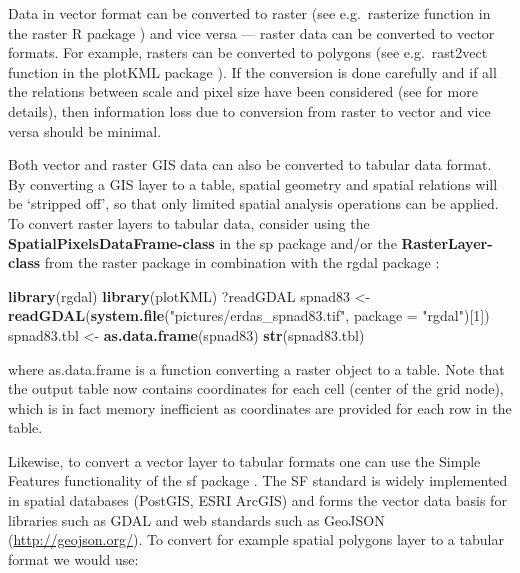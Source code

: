 \documentclass[10pt,b5paper,]{book}
\newenvironment{Shaded}{\begin{snugshade}}{\end{snugshade}}
\newcommand{\DataTypeTok}[1]{\textcolor[rgb]{0.13,0.29,0.53}{#1}}
\newcommand{\DecValTok}[1]{\textcolor[rgb]{0.00,0.00,0.81}{#1}}
\newcommand{\KeywordTok}[1]{\textcolor[rgb]{0.13,0.29,0.53}{\textbf{#1}}}
\newcommand{\NormalTok}[1]{#1}
\newcommand{\StringTok}[1]{\textcolor[rgb]{0.31,0.60,0.02}{#1}}
\theoremstyle{definition}
\theoremstyle{definition}
\theoremstyle{definition}
\theoremstyle{remark}
\begin{document}
Data in vector format can be converted to raster (see e.g.~rasterize
function in the raster R package ) and vice versa --- raster data can be
converted to vector formats. For example, rasters can be converted to
polygons (see e.g.~rast2vect function in the plotKML package ). If the
conversion is done carefully and if all the relations between scale and
pixel size have been considered (see \citet{hengl2006finding} for more
details), then information loss due to conversion from raster to vector
and vice versa should be minimal.

Both vector and raster GIS data can also be converted to tabular data
format. By converting a GIS layer to a table, spatial geometry and
spatial relations will be `stripped off', so that only limited spatial
analysis operations can be applied. To convert raster layers to tabular
data, consider using the \textbf{SpatialPixelsDataFrame-class} in the sp
package and/or the \textbf{RasterLayer-class} from the raster package in
combination with the rgdal package \citep{bivand2013classes}:

\begin{Shaded}
\begin{Highlighting}[]
\KeywordTok{library}\NormalTok{(rgdal)}
\KeywordTok{library}\NormalTok{(plotKML)}
\NormalTok{?readGDAL}
\NormalTok{spnad83 <-}\StringTok{ }\KeywordTok{readGDAL}\NormalTok{(}\KeywordTok{system.file}\NormalTok{(}\StringTok{"pictures/erdas_spnad83.tif"}\NormalTok{, }
                                \DataTypeTok{package =} \StringTok{"rgdal"}\NormalTok{)[}\DecValTok{1}\NormalTok{])}
\NormalTok{spnad83.tbl <-}\StringTok{ }\KeywordTok{as.data.frame}\NormalTok{(spnad83)}
\KeywordTok{str}\NormalTok{(spnad83.tbl)}
\end{Highlighting}
\end{Shaded}

where as.data.frame is a function converting a raster object to a table.
Note that the output table now contains coordinates for each cell
(center of the grid node), which is in fact memory inefficient as
coordinates are provided for each row in the table.

Likewise, to convert a vector layer to tabular formats one can use the
Simple Features functionality of the sf package . The SF standard is
widely implemented in spatial databases (PostGIS, ESRI ArcGIS) and forms
the vector data basis for libraries such as GDAL and web standards such
as GeoJSON (\url{http://geojson.org/}). To convert for example spatial
polygons layer to a tabular format we would use:
\end{document}
